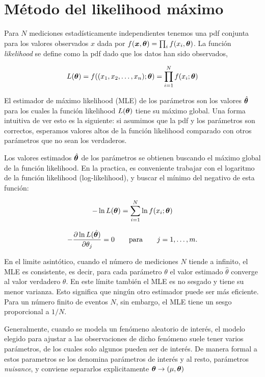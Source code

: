 \section{Método del likelihood máximo}\label{sec:MLE}

Para $N$ mediciones estadísticamente independientes tenemos una pdf conjunta
para los valores observados $x$ dada por $f(\bm{x}, \bm{\theta}) = \prod_i f(x_i,
\bm{\theta})$. La función \emph{likelihood} se define como la pdf dado que los datos
han sido observados,

\begin{equation}
  L(\bm{\theta}) = f((x_1, x_2, \ldots, x_n); \bm{\theta}) = \prod_{i=1}^{N} f(x_i;
  \bm{\theta})
\end{equation}

El estimador de máximo likelihood (MLE) de los parámetros {\btheta} son los
valores $\hat{\bm{\theta}}$ para los cuales la función likelihood
$L(\bm{\theta})$ tiene su máximo global.
Una forma intuitiva de ver esto es la siguiente: si asumimos que la pdf y los
parámetros son correctos, esperamos valores altos de la función likelihood
comparado con otros parámetros que no sean los verdaderos.

Los valores estimados $\hat{\bm{\theta}}$ de los parámetros se obtienen buscando el
máximo global de la función likelihood. En la practica, es conveniente trabajar
con el logaritmo de la función likelihood (log-likelihood), y buscar el mínimo
del negativo de esta función:

\begin{equation}
  - \ln L(\bm{\theta}) = \sum_{i=1}^{N} \ln f(x_i; \bm{\theta})
\end{equation}

\begin{equation}
  - \frac{\partial \ln L(\hat{\bm{\theta}})}{\partial \theta_j} = 0 \qquad \text{para} \qquad j =
  1,\ldots,m.
\end{equation}

En el limite asintótico, cuando el número de mediciones $N$ tiende a infinito,
el MLE es consistente, es decir, para cada parámetro $\theta$ el valor estimado
$\hat{\theta}$ converge al valor verdadero $\theta$. En este límite también el
MLE es no sesgado y tiene su menor varianza. Esto significa que ningún otro
estimador puede ser más eficiente. Para un número finito de eventos $N$, sin
embargo, el MLE tiene un sesgo proporcional a $1/N$.

Generalmente, cuando se modela un fenómeno aleatorio de interés, el modelo
elegido para ajustar a las observaciones de dicho fenómeno suele tener varios
parámetros, de los cuales solo algunos pueden ser de interés. De manera formal a
estos parametros se los denomina parámetros de interés y al resto, parámetros
\emph{nuisance}, y conviene separarlos explicitamente $\bm{\theta} \rightarrow (\mu,
\bm{\theta})$

